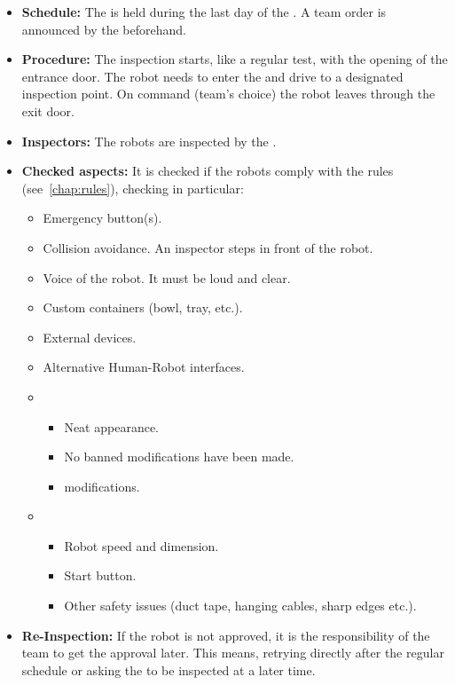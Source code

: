 \begin{itemize}
	\item \textbf{Schedule:} The \RobotInspection{} is held during the last day of the \SetupDays{}. A team order is announced by the \OC{} beforehand.
	\item \textbf{Procedure:} The inspection starts, like a regular test, with the opening of the entrance door. The robot needs to enter the \Arena{} and drive to a designated inspection point. On command (team's choice) the robot leaves through the exit door.
	\item \textbf{Inspectors:} The robots are inspected by the \TC{}.
	\item \textbf{Checked aspects:} It is checked if the robots comply with the rules (see~\ref{chap:rules}), checking in particular:
	\begin{itemize}
		\item Emergency button(s).
		\item Collision avoidance. An inspector steps in front of the robot.
		\item Voice of the robot. It must be loud and clear.
		\item Custom containers (bowl, tray, etc.).
		\item External devices.
		\item Alternative Human-Robot interfaces.
		\item {}
		\begin{itemize}
			\item Neat appearance.
			\item No banned modifications have been made.
			\item {} modifications.
		\end{itemize}
		\item {}
		\begin{itemize}
			\item Robot speed and dimension.
			\item Start button.
			\item Other safety issues (duct tape, hanging cables, sharp edges etc.).
		\end{itemize}
	\end{itemize}
	\item \textbf{Re-Inspection:} If the robot is not approved, it is the responsibility of the team to get the approval later. This means, retrying directly after the regular \RobotInspection{} schedule or asking the  to be inspected at a later time.

\end{itemize}
